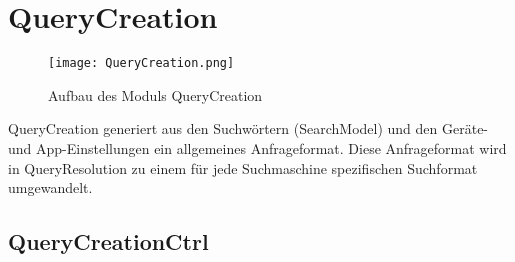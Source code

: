 
\section{QueryCreation}

\begin{figure}[htb]
  	\texttt{[image: QueryCreation.png]}
  	\caption{Aufbau des Moduls QueryCreation}
	\label{fig:Aufbau des Moduls QueryCreation}
\end{figure}

QueryCreation generiert aus den Suchwörtern (SearchModel) und den Geräte- und App-Einstellungen ein allgemeines Anfrageformat. Diese Anfrageformat wird in QueryResolution zu einem für jede Suchmaschine spezifischen Suchformat umgewandelt.

\subsection{QueryCreationCtrl}

